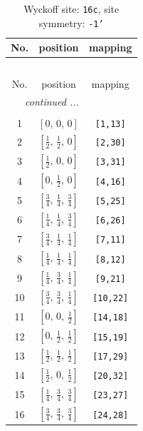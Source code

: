 \documentclass[fleqn,8pt]{jsarticle}
\begin{document}
\begin{longtable}{ccc}
\caption{Wyckoff site: {\tt 16c}, site symmetry: {\tt -1'}}
 \\
 \hline \hline
No. & position & mapping \\ \hline \endfirsthead

\multicolumn{2}{l}{\tablename\ \thetable{}} \\
 \hline \hline
No. & position & mapping \\ \hline \endhead

 \hline \hline
\multicolumn{2}{r}{\footnotesize\it continued ...} \\ \endfoot

 \hline \hline
\multicolumn{2}{r}{} \\ \endlastfoot

1 & $\left[ 0,\, 0,\, 0 \right]$ & {\tt [1,13]} \\ \hline
2 & $\left[ \frac{1}{2},\, \frac{1}{2},\, 0 \right]$ & {\tt [2,30]} \\ \hline
3 & $\left[ \frac{1}{2},\, 0,\, 0 \right]$ & {\tt [3,31]} \\ \hline
4 & $\left[ 0,\, \frac{1}{2},\, 0 \right]$ & {\tt [4,16]} \\ \hline
5 & $\left[ \frac{3}{4},\, \frac{1}{4},\, \frac{3}{4} \right]$ & {\tt [5,25]} \\ \hline
6 & $\left[ \frac{1}{4},\, \frac{1}{4},\, \frac{3}{4} \right]$ & {\tt [6,26]} \\ \hline
7 & $\left[ \frac{3}{4},\, \frac{1}{4},\, \frac{1}{4} \right]$ & {\tt [7,11]} \\ \hline
8 & $\left[ \frac{1}{4},\, \frac{1}{4},\, \frac{1}{4} \right]$ & {\tt [8,12]} \\ \hline
9 & $\left[ \frac{1}{4},\, \frac{3}{4},\, \frac{1}{4} \right]$ & {\tt [9,21]} \\ \hline
10 & $\left[ \frac{3}{4},\, \frac{3}{4},\, \frac{1}{4} \right]$ & {\tt [10,22]} \\ \hline
11 & $\left[ 0,\, 0,\, \frac{1}{2} \right]$ & {\tt [14,18]} \\ \hline
12 & $\left[ 0,\, \frac{1}{2},\, \frac{1}{2} \right]$ & {\tt [15,19]} \\ \hline
13 & $\left[ \frac{1}{2},\, \frac{1}{2},\, \frac{1}{2} \right]$ & {\tt [17,29]} \\ \hline
14 & $\left[ \frac{1}{2},\, 0,\, \frac{1}{2} \right]$ & {\tt [20,32]} \\ \hline
15 & $\left[ \frac{1}{4},\, \frac{3}{4},\, \frac{3}{4} \right]$ & {\tt [23,27]} \\ \hline
16 & $\left[ \frac{3}{4},\, \frac{3}{4},\, \frac{3}{4} \right]$ & {\tt [24,28]} \\
\end{longtable}
\end{document}

